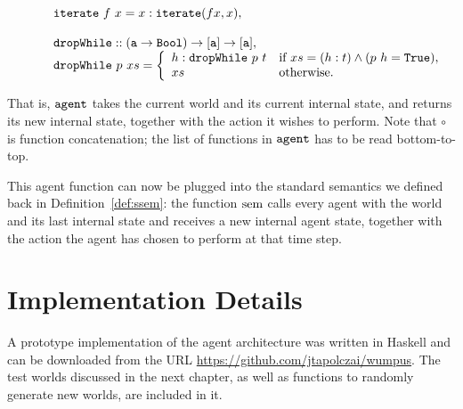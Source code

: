\begin{definition}
$$\begin{array}{l}
			\quad \quad \quad \mathtt{iterate}\ f\ x = x : \mathtt{iterate}(f x,x),\\
			\\
			\quad \quad \quad \mathtt{dropWhile} :: \mathtt{(a \rightarrow Bool) \rightarrow [a] \rightarrow [a]},\\
			\quad \quad \quad \mathtt{dropWhile}\ p\ xs  = \left\{
				\begin{array}{l l}
					h : \mathtt{dropWhile}\ p\ t & \textnormal{if } xs = (h:t) \wedge (p\ h = \mathtt{True}),\\
					xs & \textnormal{otherwise}.\\
				\end{array}
			\right.\\
		\end{array}
	$$
\end{definition}

That is, $\mathtt{agent}$ takes the current world and its current internal state, and returns its new internal state, together with the action it wishes to perform. Note that $\circ$ is function concatenation; the list of functions in $\mathtt{agent}$ has to be read bottom-to-top.

This agent function can now be plugged into the standard semantics we defined back in Definition~\ref{def:ssem}: the function $\mathrm{sem}$ calls every agent with the world and its last internal state and receives a new internal agent state, together with the action the agent has chosen to perform at that time step.

\section{Implementation Details}
A prototype implementation of the agent architecture was written in Haskell and can be downloaded from the URL \url{https://github.com/jtapolczai/wumpus}. The test worlds discussed in the next chapter, as well as functions to randomly generate new worlds, are included in it.





